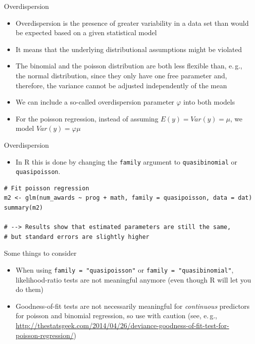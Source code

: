 \documentclass[aspectratio=169]{beamer}
\begin{document}
\begin{frame}{Overdispersion}
  \begin{itemize}
    \item Overdispersion is the presence of greater variability in a data
      set than would be expected based on a given statistical model
    \item It means that the underlying distributional assumptions might be
      violated
    \item The binomial and the poisson distribution are both less flexible
      than, e.\,g., the normal distribution, since they only have one free
      parameter and, therefore, the variance cannot be adjusted
      independently of the mean
    \item We can include a so-called overdispersion parameter $\varphi$
      into both models
    \item For the poisson regression, instead of assuming $E(y) = Var(y) =
      \mu$, we model $Var(y) = \varphi\mu$
  \end{itemize}
\end{frame}

\begin{frame}[fragile]{Overdispersion}
  \begin{itemize}
    \item In R this is done by changing the \texttt{family} argument to
      \texttt{quasibinomial} or \texttt{quasipoisson}.
  \end{itemize}


  \vfill
\begin{lstlisting}
# Fit poisson regression
m2 <- glm(num_awards ~ prog + math, family = quasipoisson, data = dat)
summary(m2)

# --> Results show that estimated parameters are still the same,
# but standard errors are slightly higher
\end{lstlisting}
\end{frame}

\begin{frame}{Some things to consider}
  \begin{itemize}
    \item When using \texttt{family = "quasipoisson"} or \texttt{family =
      "quasibinomial"}, likelihood-ratio tests are not meaningful anymore
      (even though R will let you do them)
    \item Goodness-of-fit tests are not necessarily meaningful for
      \emph{continuous} predictors for poisson and binomial regression, so
      use with caution
      (see, e.\,g.,
      \url{http://thestatsgeek.com/2014/04/26/deviance-goodness-of-fit-test-for-poisson-regression/})
  \end{itemize}
\end{frame}
\end{document}
